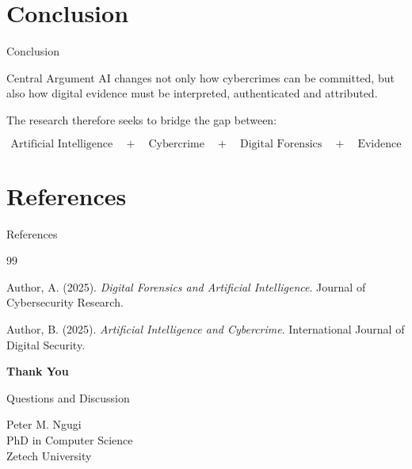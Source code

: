 \documentclass[aspectratio=169,11pt]{beamer}
\begin{document}
	
	\section{Conclusion}
	
	\begin{frame}{Conclusion}
		
		\begin{block}{Central Argument}
			AI changes not only how cybercrimes can be committed,
			but also how digital evidence must be interpreted,
			authenticated and attributed.
		\end{block}
		
		\vspace{0.5cm}
		
		The research therefore seeks to bridge the gap between:
		
		\[
		\boxed{
			\text{Artificial Intelligence}
			\quad+\quad
			\text{Cybercrime}
			\quad+\quad
			\text{Digital Forensics}
			\quad+\quad
			\text{Evidence}
		}
		\]
		
	\end{frame}
	
	
	\section{References}
	
	\begin{frame}{References}
		
		\small
		
		\begin{thebibliography}{99}
			
			Author, A. (2025).
			\textit{Digital Forensics and Artificial Intelligence}.
			Journal of Cybersecurity Research.
			
			Author, B. (2025).
			\textit{Artificial Intelligence and Cybercrime}.
			International Journal of Digital Security.
			
		\end{thebibliography}
		
	\end{frame}
	
	
	\begin{frame}
		
		\begin{center}
			
			\Huge
			\textbf{Thank You}
			
			\vspace{0.8cm}
			
			\Large
			Questions and Discussion
			
			\vspace{1cm}
			
			\normalsize
			Peter M. Ngugi\\
			PhD in Computer Science\\
			Zetech University
			
		\end{center}
		
	\end{frame}
	
\end{document}
